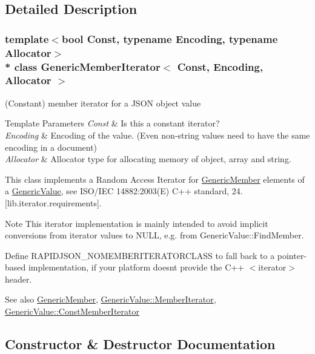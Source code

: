 \subsection{Detailed Description}
\subsubsection*{template$<$bool Const, typename Encoding, typename Allocator$>$\\*
class Generic\+Member\+Iterator$<$ Const, Encoding, Allocator $>$}

(Constant) member iterator for a J\+S\+ON object value 


\begin{DoxyTemplParams}{Template Parameters}
{\em Const} & Is this a constant iterator? \\
\hline
{\em Encoding} & Encoding of the value. (Even non-\/string values need to have the same encoding in a document) \\
\hline
{\em Allocator} & Allocator type for allocating memory of object, array and string.\\
\hline
\end{DoxyTemplParams}
This class implements a Random Access Iterator for \hyperlink{struct_generic_member}{Generic\+Member} elements of a \hyperlink{class_generic_value}{Generic\+Value}, see I\+S\+O/\+I\+EC 14882\+:2003(E) C++ standard, 24. \mbox{[}lib.\+iterator.\+requirements\mbox{]}.

\begin{DoxyNote}{Note}
This iterator implementation is mainly intended to avoid implicit conversions from iterator values to {\ttfamily N\+U\+LL}, e.\+g. from Generic\+Value\+::\+Find\+Member.

Define {\ttfamily R\+A\+P\+I\+D\+J\+S\+O\+N\+\_\+\+N\+O\+M\+E\+M\+B\+E\+R\+I\+T\+E\+R\+A\+T\+O\+R\+C\+L\+A\+SS} to fall back to a pointer-\/based implementation, if your platform doesn\textquotesingle{}t provide the C++ $<$iterator$>$ header.
\end{DoxyNote}
\begin{DoxySeeAlso}{See also}
\hyperlink{struct_generic_member}{Generic\+Member}, \hyperlink{class_generic_value_a349b8faae61edc42b4289726820be439}{Generic\+Value\+::\+Member\+Iterator}, \hyperlink{class_generic_value_aac08c3e660a9036d3dcb8b10ff6c61f4}{Generic\+Value\+::\+Const\+Member\+Iterator} 
\end{DoxySeeAlso}


\subsection{Constructor \& Destructor Documentation}
